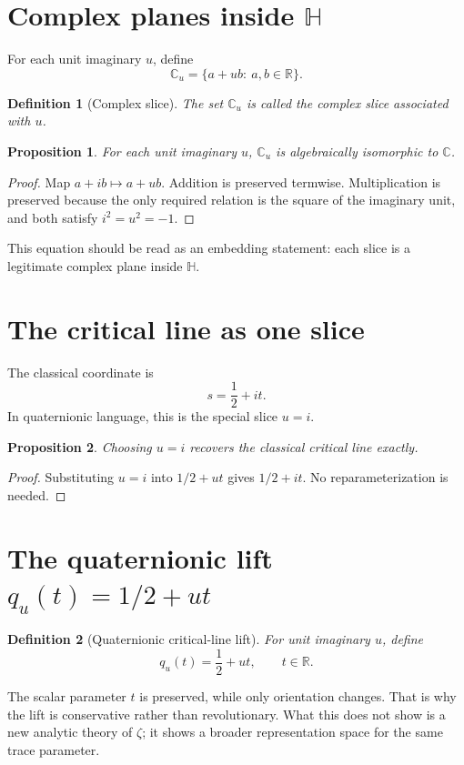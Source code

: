 \documentclass[11pt]{article}
\newtheorem{definition}{Definition}
\newtheorem{proposition}{Proposition}
\begin{document}
\section{Complex planes inside $\mathbb H$}
For each unit imaginary $u$, define
\[
\mathbb C_u=\{a+ub:\ a,b\in\mathbb R\}.
\]

\begin{definition}[Complex slice]
The set $\mathbb C_u$ is called the complex slice associated with $u$.
\end{definition}

\begin{proposition}
For each unit imaginary $u$, $\mathbb C_u$ is algebraically isomorphic to $\mathbb C$.
\end{proposition}

\begin{proof}
Map $a+ib\mapsto a+ub$. Addition is preserved termwise. Multiplication is preserved because the only required relation is the square of the imaginary unit, and both satisfy $i^2=u^2=-1$.
\end{proof}
This equation should be read as an embedding statement: each slice is a legitimate complex plane inside $\mathbb H$.

\section{The critical line as one slice}
The classical coordinate is
\[
s=\frac12+it.
\]
In quaternionic language, this is the special slice $u=i$.

\begin{proposition}
Choosing $u=i$ recovers the classical critical line exactly.
\end{proposition}

\begin{proof}
Substituting $u=i$ into $1/2+ut$ gives $1/2+it$. No reparameterization is needed.
\end{proof}

\section{The quaternionic lift $q_u(t)=1/2+ut$}
\begin{definition}[Quaternionic critical-line lift]
For unit imaginary $u$, define
\[
q_u(t)=\frac12+ut,\qquad t\in\mathbb R.
\]
\end{definition}
The scalar parameter $t$ is preserved, while only orientation changes. That is why the lift is conservative rather than revolutionary. What this does not show is a new analytic theory of $\zeta$; it shows a broader representation space for the same trace parameter.
\end{document}
